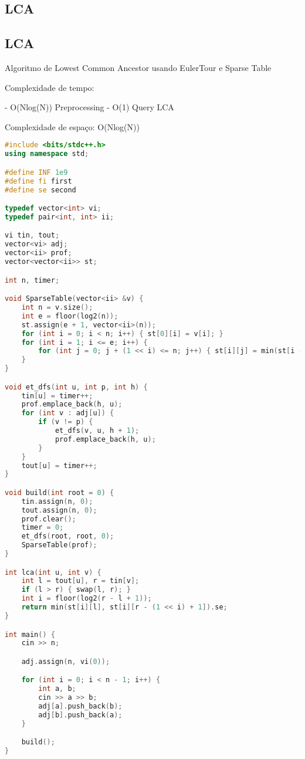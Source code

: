 \documentclass[11pt, a4paper, twoside]{article}
\begin{document}
\subsection{LCA}

\subsection{LCA}


Algoritmo de Lowest Common Ancestor usando EulerTour e Sparse Table

Complexidade de tempo:

- O(Nlog(N)) Preprocessing
- O(1) Query LCA

Complexidade de espaço: O(Nlog(N))

\begin{lstlisting}[language=C++]
#include <bits/stdc++.h>
using namespace std;

#define INF 1e9
#define fi first
#define se second

typedef vector<int> vi;
typedef pair<int, int> ii;

vi tin, tout;
vector<vi> adj;
vector<ii> prof;
vector<vector<ii>> st;

int n, timer;

void SparseTable(vector<ii> &v) {
    int n = v.size();
    int e = floor(log2(n));
    st.assign(e + 1, vector<ii>(n));
    for (int i = 0; i < n; i++) { st[0][i] = v[i]; }
    for (int i = 1; i <= e; i++) {
        for (int j = 0; j + (1 << i) <= n; j++) { st[i][j] = min(st[i - 1][j], st[i - 1][j + (1 << (i - 1))]); }
    }
}

void et_dfs(int u, int p, int h) {
    tin[u] = timer++;
    prof.emplace_back(h, u);
    for (int v : adj[u]) {
        if (v != p) {
            et_dfs(v, u, h + 1);
            prof.emplace_back(h, u);
        }
    }
    tout[u] = timer++;
}

void build(int root = 0) {
    tin.assign(n, 0);
    tout.assign(n, 0);
    prof.clear();
    timer = 0;
    et_dfs(root, root, 0);
    SparseTable(prof);
}

int lca(int u, int v) {
    int l = tout[u], r = tin[v];
    if (l > r) { swap(l, r); }
    int i = floor(log2(r - l + 1));
    return min(st[i][l], st[i][r - (1 << i) + 1]).se;
}

int main() {
    cin >> n;

    adj.assign(n, vi(0));

    for (int i = 0; i < n - 1; i++) {
        int a, b;
        cin >> a >> b;
        adj[a].push_back(b);
        adj[b].push_back(a);
    }

    build();
}
\end{lstlisting}
\end{document}
